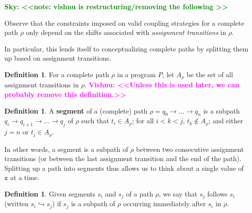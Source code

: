 \documentclass[12pt]{article}
\newcommand{\todo}[2]{\textcolor{#1}{\textbf{#2}}}
\newcommand{\sky}[1]{\todo{green}{Sky: <<#1>>}}
\newcommand{\vishnu}[1]{\todo{magenta}{Vishnu: <<#1>>}}
\theoremstyle{definition}
\newtheorem{defn}[thm]{Definition}
\begin{document}
\sky{note: vishnu is restructuring/removing the following }

Observe that the constraints imposed on valid coupling strategies for a complete path $\rho$ only depend on the shifts associated with \textit{assignment transitions} in $\rho$. 

In particular, this lends itself to conceptualizing complete paths by splitting them up based on assignment transitions. 

\begin{defn}
    For a complete path $\rho$ in a program $P$, let $A_\rho$ be the set of all assignment transitions in $\rho$. \vishnu{Unless this is used later, we can probably remove this definition.}
\end{defn}

\begin{defn}
    A \textbf{segment} of a (complete) path $\rho = q_0\to\ldots\to q_n$ is a subpath $q_i \to q_{i+1}\to \ldots \to q_j$ of $\rho$ such that $t_i \in A_\rho$; for all $i<k<j$, $t_k \notin A_\rho$; and either $j=n$ or $t_j \in A_\rho$.
\end{defn}

In other words, a segment is a subpath of $\rho$ between two consecutive assignment transitions (or between the last assignment transition and the end of the path). Splitting up a path into segments thus allows us to think about a single value of $\texttt{x}$ at a time.


\begin{defn}
    Given segments $s_i$ and $s_j$ of a path $\rho$, we say that $s_j$ follows $s_i$ (written $s_i \hookrightarrow s_j$) if $s_j$ is a subpath of $\rho$ occurring immediately after $s_i$ in $\rho$.
\end{defn}
\end{document}
